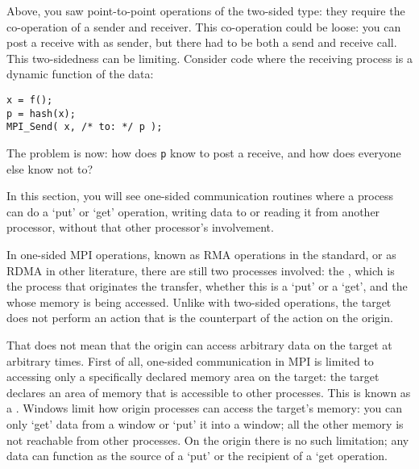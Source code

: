 

Above, you saw  point-to-point operations of the two-sided type:
they require the co-operation of a sender and
receiver. This co-operation could be loose: you can post a receive
with  as sender, but there had to be both a send and
receive call. This two-sidedness can be limiting. Consider code where the receiving
process is a dynamic function of the data:
\begin{lstlisting}
x = f();
p = hash(x);
MPI_Send( x, /* to: */ p );
\end{lstlisting}
The problem is now: how does \lstinline{p} know to post a receive,
and how does everyone else know not to?

In this section, you will see one-sided communication 
routines where a process
can do a `put' or `get' operation, writing data to or reading it from
another processor, without that other processor's involvement.

In one-sided MPI operations, 
known as \acf{RMA} operations in the standard,
or as \acf{RDMA} in other literature,
there
are still two processes involved: the , which is the
process that originates the transfer, whether this is a `put' or a `get',
and the  whose
memory is being accessed. Unlike with two-sided operations, the target
does not perform an action that is the counterpart of the action on the origin.

That does not mean that the origin can access arbitrary data on the target
at arbitrary times. First of all, one-sided communication in MPI
is limited to accessing only a specifically declared memory area on the target:
the target declares an area of
memory that is accessible to other processes. This is known
as a . Windows limit how origin processes can access
the target's memory: you can only `get' data from a window or `put' it
into a window; all the other memory is not reachable from other processes.
On the origin there is no such limitation;
any data can function as the source of a `put'
or the recipient of a `get operation.

